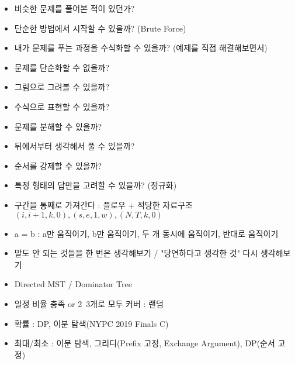 \documentclass[landscape, 8pt, a4paper, oneside, twocolumn]{extarticle}
\begin{document}
\begin{itemize}
    \setlength\itemsep{0.1em}
    \item 비슷한 문제를 풀어본 적이 있던가?
    \item 단순한 방법에서 시작할 수 있을까? (Brute Force)
    \item 내가 문제를 푸는 과정을 수식화할 수 있을까? (예제를 직접 해결해보면서)
    \item 문제를 단순화할 수 없을까?
    \item 그림으로 그려볼 수 있을까?
    \item 수식으로 표현할 수 있을까?
    \item 문제를 분해할 수 있을까?
    \item 뒤에서부터 생각해서 풀 수 있을까?
    \item 순서를 강제할 수 있을까?
    \item 특정 형태의 답만을 고려할 수 있을까? (정규화)
    \item 구간을 통째로 가져간다 : 플로우 + 적당한 자료구조 $(i,i+1,k,0),(s,e,1,w),(N,T,k,0)$
    \item a = b : a만 움직이기, b만 움직이기, 두 개 동시에 움직이기, 반대로 움직이기
    \item 말도 안 되는 것들을 한 번은 생각해보기 / "당연하다고 생각한 것" 다시 생각해보기
    \item Directed MST / Dominator Tree
    \item 일정 비율 충족 or 2~3개로 모두 커버 : 랜덤
    \item 확률 : DP, 이분 탐색(NYPC 2019 Finals C)
    \item 최대/최소 : 이분 탐색, 그리디(Prefix 고정, Exchange Argument), DP(순서 고정)
\end{itemize}
\end{document}
